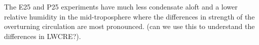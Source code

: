 \documentclass[11pt]{article}   	%
\begin{document}
The E25 and P25 experiments have much less condensate aloft and a lower relative humidity in the mid-troposphere
where the differences in strength of the overturning circulation are most pronounced. 
(can we use this to understand the differences in LWCRE?).  

\end{document}
